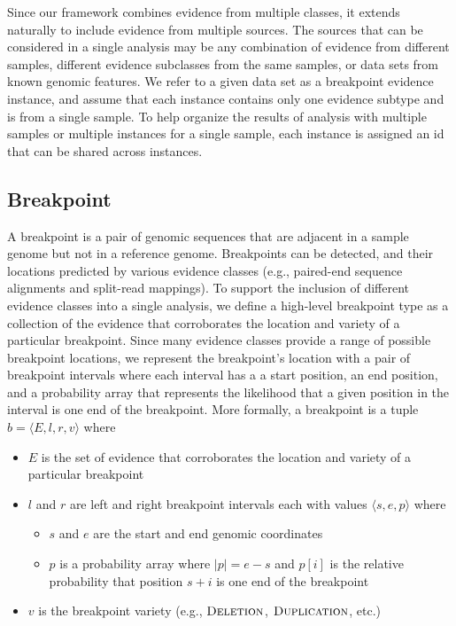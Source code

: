 \documentclass[11pt]{article}
\begin{document}
Since our framework combines evidence from multiple classes, it extends
naturally to include evidence from multiple sources.  The sources that can be
considered in a single analysis may be any combination of evidence from
different samples, different evidence subclasses from the same samples, or
data sets from known genomic features.  We refer to a given data set as a
breakpoint evidence instance, and assume that each instance contains only one
evidence subtype and is from a single sample.  To help organize the results of
analysis with multiple samples or multiple instances for a single sample,
each instance is assigned an id that can be shared across instances.


\subsection{Breakpoint}

A breakpoint is a pair of genomic sequences that are adjacent in a sample genome
but not in a reference genome. Breakpoints can be detected, and their locations
predicted by various evidence classes (e.g., paired-end sequence alignments and
split-read mappings).  To support the inclusion of different evidence classes
into a single analysis, we define a high-level breakpoint type as a collection
of the evidence that corroborates the location and variety of a particular
breakpoint.  Since many evidence classes provide a range of possible breakpoint
locations, we represent the breakpoint's location with a pair of breakpoint
intervals where each interval has a a start position, an end position, and a
probability array that represents the likelihood that a given position in the
interval is one end of the breakpoint.  More formally, a breakpoint is a tuple 
$b=\langle E,l,r,v \rangle$ where
\begin{itemize}
\item $E$ is the set of evidence that corroborates the location and variety of a
particular breakpoint
\item $l$ and $r$ are left and right breakpoint intervals each with values
	$\langle s, e, p \rangle$ where
	\begin{itemize}
		\item $s$ and $e$ are the start and end genomic coordinates
		\item $p$ is a probability array where $|p|=e-s$ and $p[i]$ is the
		relative probability that position $s+i$ is one end of the breakpoint
	\end{itemize}
\item  $v$ is the breakpoint variety (e.g., $\textsc{Deletion}$,
$\textsc{Duplication}$, etc.)
\end{itemize}
\end{document}
